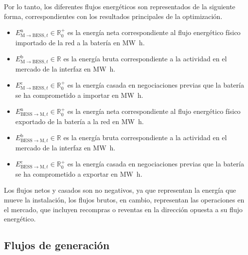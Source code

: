 Por lo tanto, los diferentes flujos energéticos son representados de la siguiente forma, correspondientes con los resultados principales de la optimización.

\begin{itemize}

  \item \( E^{\mathrm{n}}_{\mathrm{M} \rightarrow \mathrm{BESS}, t} \in \mathbb{R}^{+}_{0} \) es la energía neta correspondiente al flujo energético físico importado de la red a la batería en \si{{\mega\watt\hour}}.

  \item \( E^{\mathrm{b}}_{\mathrm{M} \rightarrow \mathrm{BESS}, t} \in \mathbb{R} \) es la energía bruta correspondiente a la actividad en el mercado de la interfaz en \si{{\mega\watt\hour}}.

  \item \( E^{\mathrm{c}}_{\mathrm{M} \rightarrow \mathrm{BESS}, t} \in \mathbb{R}^{+}_{0} \) es la energía casada en negociaciones previas que la batería se ha comprometido a importar en \si{{\mega\watt\hour}}.

  \item \( E^{\mathrm{n}}_{\mathrm{BESS} \rightarrow \mathrm{M}, t} \in \mathbb{R}^{+}_{0} \) es la energía neta correspondiente al flujo energético físico exportado de la batería a la red en \si{{\mega\watt\hour}}.

  \item \( E^{\mathrm{b}}_{\mathrm{BESS} \rightarrow \mathrm{M}, t} \in \mathbb{R} \) es la energía bruta correspondiente a la actividad en el mercado de la interfaz en \si{{\mega\watt\hour}}.

  \item \( E^{\mathrm{c}}_{\mathrm{BESS} \rightarrow \mathrm{M}, t} \in \mathbb{R}^{+}_{0} \) es la energía casada en negociaciones previas que la batería se ha comprometido a exportar en \si{{\mega\watt\hour}}.

\end{itemize}

Los flujos netos y casados son no negativos, ya que representan la energía que mueve la instalación, los flujos brutos, en cambio, representan las operaciones en el mercado, que incluyen recompras o reventas en la dirección opuesta a su flujo energético.

\subsection{Flujos de generación}%
\label{makereference5.1.3}


